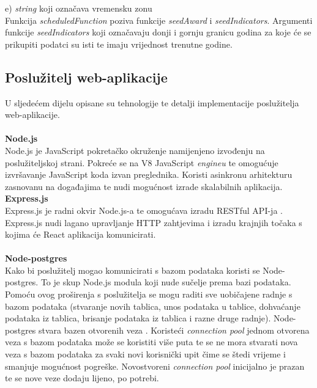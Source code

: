 \documentclass[times, utf8, zavrsni]{fer}
\begin{document}
    e) \emph{string} koji označava vremensku zonu
\\Funkcija \emph{scheduledFunction} poziva funkcije \emph{seedAward} i \emph{seedIndicators}. Argumenti funkcije \emph{seedIndicators}  
koji označavaju donji i gornju granicu godina za koje će se prikupiti podatci su isti te imaju vrijednost trenutne godine.
\\ \subsection{Poslužitelj web-aplikacije}
U sljedećem dijelu opisane su tehnologije te detalji implementacije poslužitelja web-aplikacije.
\\\\
\textbf{Node.js} 
\\ Node.js je JavaScript pokretačko okruženje  namijenjeno izvođenju na poslužiteljskoj strani. Pokreće se na V8 JavaScript \emph{engineu}
te omogućuje izvršavanje JavaScript koda izvan preglednika. Koristi asinkronu arhitekturu zasnovanu na događajima 
te nudi mogućnost izrade skalabilnih aplikacija. 
\\\textbf{Express.js}
\\ Express.js je radni okvir  Node.js-a te omogućava izradu RESTful API-ja . Express.js nudi
lagano upravljanje HTTP zahtjevima i izradu krajnjih točaka  s kojima će React aplikacija komunicirati.
\\ \\ \textbf{Node-postgres} 
\\ Kako bi poslužitelj mogao komunicirati s bazom podataka koristi se Node-postgres. To je skup Node.js modula koji nude 
sučelje prema bazi podataka. Pomoću ovog proširenja s poslužitelja se mogu raditi sve uobičajene radnje s bazom podataka (stvaranje novih tablica, 
unos podataka u tablice, dohvaćanje podataka iz tablica, brisanje podataka iz tablica i razne druge radnje).
Node-postgres stvara bazen otvorenih veza . Koristeći \emph{connection pool} jednom otvorena veza s bazom podataka može se koristiti više puta te se ne mora 
stvarati nova veza s bazom podataka za svaki novi korisnički upit čime se štedi vrijeme i smanjuje mogućnost pogreške. Novostvoreni \emph{connection pool} inicijalno 
je prazan te se nove veze dodaju lijeno, po potrebi.
\end{document}
